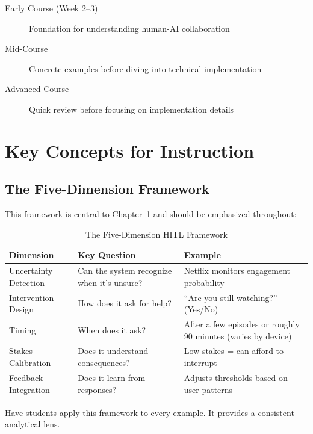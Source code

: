 \begin{description}
    \item[Early Course (Week 2--3)] Foundation for understanding human-AI collaboration
    \item[Mid-Course] Concrete examples before diving into technical implementation
    \item[Advanced Course] Quick review before focusing on implementation details
\end{description}

\section{Key Concepts for Instruction}

\subsection{The Five-Dimension Framework}

This framework is central to Chapter~1 and should be emphasized throughout:

\begin{table}[htbp]
\caption{The Five-Dimension HITL Framework}
\label{tab:five-dimension-framework}
\centering
\begin{tabular}{@{}p{3.5cm}p{4cm}p{4cm}@{}}
\toprule
\textbf{Dimension} & \textbf{Key Question} & \textbf{Example} \\
\midrule
Uncertainty Detection & Can the system recognize when it's unsure? & Netflix monitors engagement probability \\
Intervention Design & How does it ask for help? & ``Are you still watching?'' (Yes/No) \\
Timing & When does it ask? & After a few episodes or roughly 90 minutes (varies by device) \\
Stakes Calibration & Does it understand consequences? & Low stakes = can afford to interrupt \\
Feedback Integration & Does it learn from responses? & Adjusts thresholds based on user patterns \\
\bottomrule
\end{tabular}
\end{table}

\begin{technote}
Have students apply this framework to every example. It provides a consistent analytical lens.
\end{technote}

